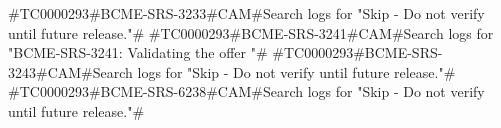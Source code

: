 #TC0000293#BCME-SRS-3233#CAM#Search logs for "Skip - Do not verify until future release."#
#TC0000293#BCME-SRS-3241#CAM#Search logs for "BCME-SRS-3241: Validating the offer "#
#TC0000293#BCME-SRS-3243#CAM#Search logs for "Skip - Do not verify until future release."#
#TC0000293#BCME-SRS-6238#CAM#Search logs for "Skip - Do not verify until future release."#
